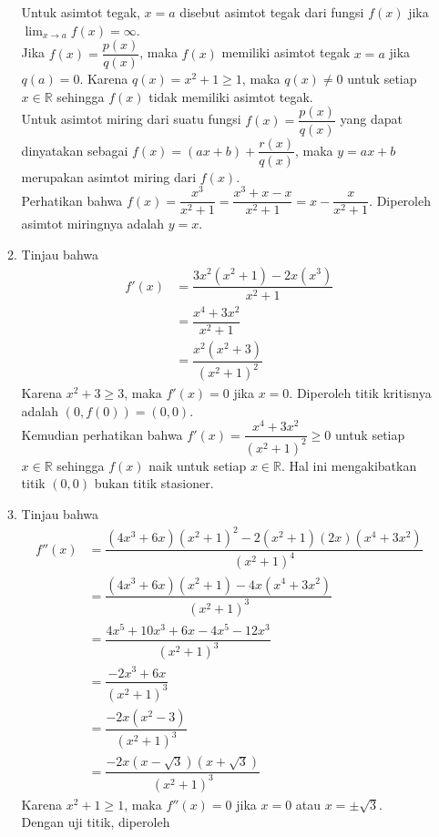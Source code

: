\documentclass{article}
\begin{document}
\begin{enumerate}
\begin{enumerate}
		Untuk asimtot tegak, $x=a$ disebut asimtot tegak dari fungsi $f(x)$ jika $\displaystyle \lim_{x\rightarrow a} f(x)=\infty$. \\
		Jika $f(x)=\dfrac{p(x)}{q(x)}$, maka $f(x)$ memiliki asimtot tegak $x=a$ jika $q(a)=0$. Karena $q(x)=x^2+1\geq 1$, maka $q(x)\neq 0$ untuk setiap $x\in \mathbb{R}$ sehingga $f(x)$ tidak memiliki asimtot tegak.\\
		Untuk asimtot miring dari suatu fungsi $f(x)=\dfrac{p(x)}{q(x)}$ yang dapat dinyatakan sebagai $f(x)=(ax+b)+\dfrac{r(x)}{q(x)}$, maka $y=ax+b$ merupakan asimtot miring dari $f(x)$.\\
		Perhatikan bahwa $f(x)=\dfrac{x^3}{x^2+1} = \dfrac{x^3+x-x}{x^2+1} = x-\dfrac{x}{x^2+1}$.
		Diperoleh asimtot miringnya adalah $y=x$.
		\item Tinjau bahwa 
		\begin{align*}
		f'(x) &= \dfrac{3x^2(x^2+1)-2x(x^3)}{x^2+1}\\
		&=\dfrac{x^4+3x^2}{x^2+1}\\
		&= \dfrac{x^2(x^2+3)}{(x^2+1)^2}
		\end{align*}
		Karena $x^2+3\geq 3$, maka $f'(x)=0$ jika $x=0$. Diperoleh titik kritisnya adalah $(0,f(0))=(0,0)$. \\		
		Kemudian perhatikan bahwa $f'(x)=\dfrac{x^4+3x^2}{(x^2+1)^2} \geq 0$ untuk setiap $x\in\mathbb{R}$ sehingga $f(x)$ naik untuk setiap $x\in\mathbb{R}$. Hal ini mengakibatkan titik $(0,0)$ bukan titik stasioner.
		\item Tinjau bahwa 
		\begin{align*}
		f''(x) &= \dfrac{(4x^3+6x)(x^2+1)^2-2(x^2+1)(2x)(x^4+3x^2)}{(x^2+1)^4}\\
		&= \dfrac{(4x^3+6x)(x^2+1)-4x(x^4+3x^2)}{(x^2+1)^3}\\
		&= \dfrac{4x^5+10x^3+6x-4x^5-12x^3}{(x^2+1)^3}\\
		&=\dfrac{-2x^3+6x}{(x^2+1)^3}\\
		&= \dfrac{-2x(x^2-3)}{(x^2+1)^3}\\
		&= \dfrac{-2x(x-\sqrt{3})(x+\sqrt{3})}{(x^2+1)^3}
		\end{align*}
		Karena $x^2+1\geq 1$, maka $f''(x)=0$ jika $x=0$ atau $x=\pm \sqrt{3}$. \\
		Dengan uji titik, diperoleh 
		\begin{center}
\end{center}
\end{enumerate}
\end{enumerate}
\end{document}

